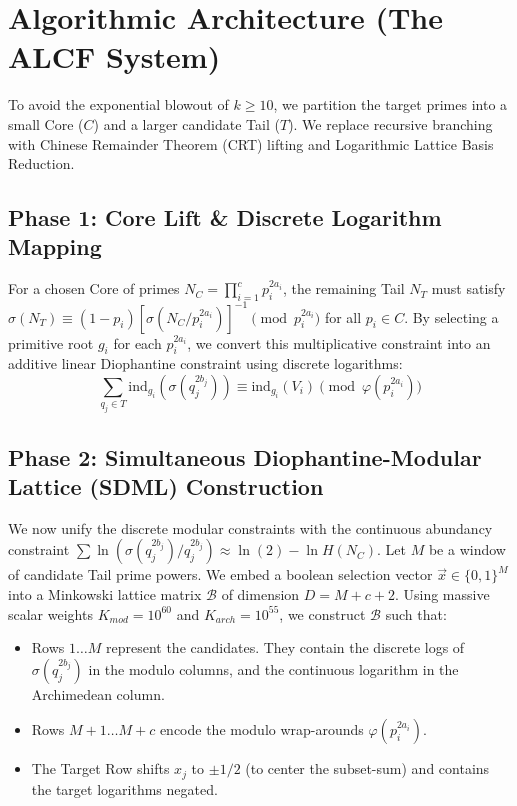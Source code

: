 \documentclass[11pt,a4paper]{article}
\begin{document}
\section{Algorithmic Architecture (The ALCF System)}
To avoid the exponential blowout of $k \ge 10$, we partition the target primes into a small Core ($C$) and a larger candidate Tail ($T$). We replace recursive branching with Chinese Remainder Theorem (CRT) lifting and Logarithmic Lattice Basis Reduction.

\subsection{Phase 1: Core Lift \& Discrete Logarithm Mapping}
For a chosen Core of primes $N_C = \prod_{i=1}^c p_i^{2a_i}$, the remaining Tail $N_T$ must satisfy $\sigma(N_T) \equiv (1-p_i)[\sigma(N_C/p_i^{2a_i})]^{-1} \pmod{p_i^{2a_i}}$ for all $p_i \in C$.
By selecting a primitive root $g_i$ for each $p_i^{2a_i}$, we convert this multiplicative constraint into an additive linear Diophantine constraint using discrete logarithms:
$$ \sum_{q_j \in T} \text{ind}_{g_i}(\sigma(q_j^{2b_j})) \equiv \text{ind}_{g_i}(V_i) \pmod{\varphi(p_i^{2a_i})} $$

\subsection{Phase 2: Simultaneous Diophantine-Modular Lattice (SDML) Construction}
We now unify the discrete modular constraints with the continuous abundancy constraint $\sum \ln(\sigma(q_j^{2b_j})/q_j^{2b_j}) \approx \ln(2) - \ln H(N_C)$.
Let $M$ be a window of candidate Tail prime powers. We embed a boolean selection vector $\vec{x} \in \{0, 1\}^M$ into a Minkowski lattice matrix $\mathcal{B}$ of dimension $D = M + c + 2$.
Using massive scalar weights $K_{mod} = 10^{60}$ and $K_{arch} = 10^{55}$, we construct $\mathcal{B}$ such that:
\begin{itemize}
    \item Rows $1 \dots M$ represent the candidates. They contain the discrete logs of $\sigma(q_j^{2b_j})$ in the modulo columns, and the continuous logarithm in the Archimedean column.
    \item Rows $M+1 \dots M+c$ encode the modulo wrap-arounds $\varphi(p_i^{2a_i})$.
    \item The Target Row shifts $x_j$ to $\pm 1/2$ (to center the subset-sum) and contains the target logarithms negated.
\end{itemize}
\end{document}
